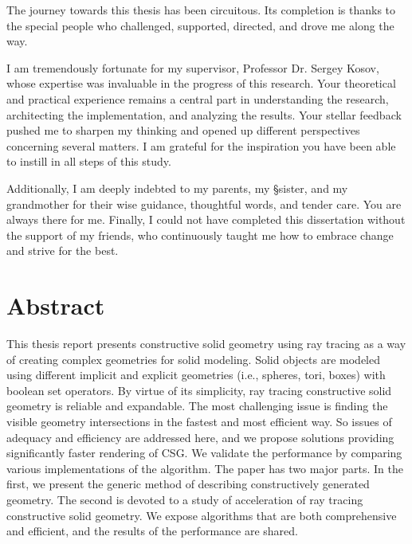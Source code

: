 \documentclass[a4paper,11pt,oneside]{article}
\begin{document}
The journey towards this thesis has been circuitous. Its completion is thanks to the special people who challenged, supported, directed, and drove me along the way.

I am tremendously fortunate for my supervisor, Professor Dr. Sergey Kosov, whose expertise was invaluable in the progress of this research. Your theoretical and practical experience remains a central part in understanding the research, architecting the implementation, and analyzing the results.  Your stellar feedback pushed me to sharpen my thinking and opened up different perspectives concerning several matters. I am grateful for the inspiration you have been able to instill in all steps of this study.

Additionally, I am deeply indebted to my parents, my §sister, and my grandmother for their wise guidance, thoughtful words, and tender care. You are always there for me. Finally, I could not have completed this dissertation without the support of my friends, who continuously taught me how to embrace change and strive for the best.  

\newpage

\section*{Abstract}
  
   
This thesis report presents constructive solid geometry using ray tracing as a way of creating complex geometries for solid modeling. Solid objects are modeled using different implicit and explicit geometries (i.e., spheres, tori, boxes) with boolean set operators. By virtue of its simplicity, ray tracing constructive solid geometry is reliable and expandable. The most challenging issue is finding the visible geometry intersections in the fastest and most efficient way. So issues of adequacy and efficiency are addressed here, and we propose solutions providing significantly faster rendering of CSG. We validate the performance by comparing various implementations of the algorithm. 
The paper has two major parts. In the first, we present the generic method of describing constructively generated geometry. The second is devoted to a study of acceleration of ray tracing constructive solid geometry. We expose algorithms that are both comprehensive and efficient, and the results of the performance are shared.
   
\end{document}
